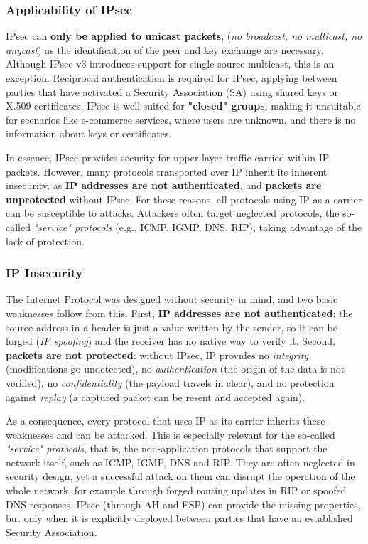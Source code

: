 \subsubsection{Applicability of IPsec}
IPsec can \textbf{only be applied to unicast packets}, (\textit{no broadcast, no multicast, no anycast}) as the identification of the peer and key exchange are necessary. Although IPsec v3 introduces support for single-source multicast, this is an exception. Reciprocal authentication is required for IPsec, applying between parties that have activated a Security Association (SA) using shared keys or X.509 certificates. IPsec is well-suited for \textbf{"closed" groups}, making it unsuitable for scenarios like e-commerce services, where users are unknown, and there is no information about keys or certificates.

In essence, IPsec provides security for upper-layer traffic carried within IP packets. However, many protocols transported over IP inherit its inherent insecurity, as \textbf{IP addresses are not authenticated}, and \textbf{packets are unprotected} without IPsec. For these reasons, all protocols using IP as a carrier can be susceptible to attacks. Attackers often target neglected protocols, the so-called \textit{"service" protocols} (e.g., ICMP, IGMP, DNS, RIP), taking advantage of the lack of protection.

\subsubsection{IP Insecurity}
The Internet Protocol was designed without security in mind, and two basic weaknesses follow from this. First, \textbf{IP addresses are not authenticated}: the source address in a header is just a value written by the sender, so it can be forged (\textit{IP spoofing}) and the receiver has no native way to verify it. Second, \textbf{packets are not protected}: without IPsec, IP provides no \textit{integrity} (modifications go undetected), no \textit{authentication} (the origin of the data is not verified), no \textit{confidentiality} (the payload travels in clear), and no protection against \textit{replay} (a captured packet can be resent and accepted again).

As a consequence, every protocol that uses IP as its carrier inherits these weaknesses and can be attacked. This is especially relevant for the so-called \textit{"service" protocols}, that is, the non-application protocols that support the network itself, such as ICMP, IGMP, DNS and RIP. They are often neglected in security design, yet a successful attack on them can disrupt the operation of the whole network, for example through forged routing updates in RIP or spoofed DNS responses. IPsec (through AH and ESP) can provide the missing properties, but only when it is explicitly deployed between parties that have an established Security Association.

